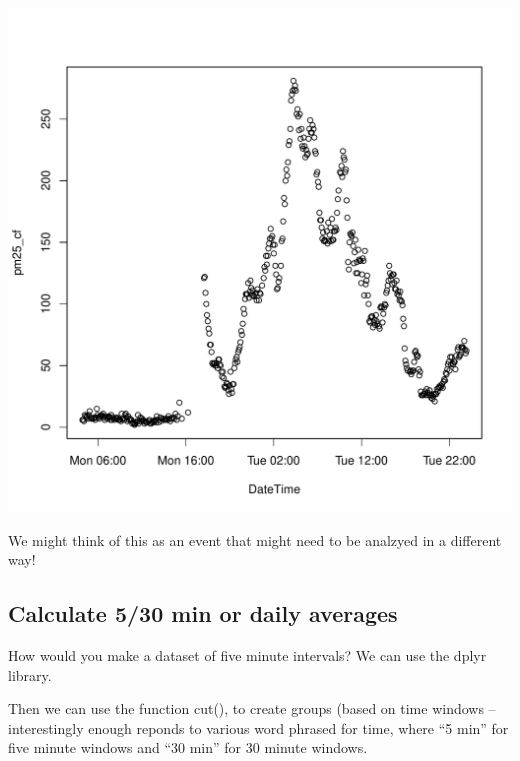 \documentclass{article}\usepackage[]{graphicx}\usepackage[]{color}
\makeatletter
\def\maxwidth{ %
  \ifdim\Gin@nat@width>\linewidth
    \linewidth
  \else
    \Gin@nat@width
  \fi
}
\newenvironment{knitrout}{}{} %
\def\maxwidth{ %
  \ifdim\Gin@nat@width>\linewidth
    \linewidth
  \else
    \Gin@nat@width
  \fi
}
\makeatother
\begin{document}
\begin{knitrout}
\color{fgcolor}
\includegraphics[width=\maxwidth]{figure/unnamed-chunk-13-1} 

\end{knitrout}

We might think of this as an event that might need to be analzyed in a different way!  

\subsection{Calculate 5/30 min or daily averages}

How would you make a dataset of five minute intervals? We can use the dplyr library. 

Then we can use the function cut(), to create groups (based on time windows -- interestingly enough reponds to various word phrased for time, where ``5 min'' for five minute windows and ``30 min'' for 30 minute windows. 
\end{document}
